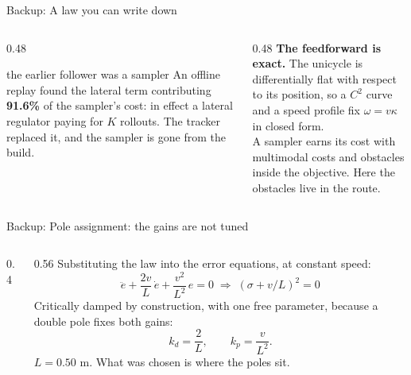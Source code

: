 \documentclass[10pt, aspectratio=169]{beamer}
\begin{document}
\begin{frame}{Backup: A law you can write down}
  \begin{columns}[c]
    \begin{column}{0.48\textwidth}
      \begin{measured}{the earlier follower was a sampler}
        \small
        An offline replay found the lateral term contributing \textbf{91.6\%} of the sampler's cost:
        in effect a lateral regulator paying for $K$ rollouts. The tracker replaced it, and the
        sampler is gone from the build.
      \end{measured}
    \end{column}
    \begin{column}{0.48\textwidth}
      \small
      \textbf{The feedforward is exact.} The unicycle is differentially flat with respect to its
      position, so a $C^2$ curve and a speed profile fix $\omega=v\kappa$ in closed form.\\[0.6em]
      A sampler earns its cost with multimodal costs and obstacles inside the objective. Here the
      obstacles live in the route.
    \end{column}
  \end{columns}
  \vspace{0.6em}
\end{frame}

\begin{frame}{Backup: Pole assignment: the gains are not tuned}
  \begin{columns}[c]
    \begin{column}{0.4\textwidth}
      \centering
    \end{column}
    \begin{column}{0.56\textwidth}
      Substituting the law into the error equations, at constant speed:
      \[
        \ddot e + \frac{2v}{L}\,\dot e + \frac{v^2}{L^2}\,e = 0
        \;\Longrightarrow\; (\sigma + v/L)^2 = 0
      \]
      \small
      Critically damped by construction, with one free parameter, because a double pole fixes both
      gains:
      \[ k_d = \frac{2}{L},\qquad k_p = \frac{v}{L^2}. \]
      $L = 0.50$ m. What was chosen is where the poles sit.
    \end{column}
  \end{columns}
\end{frame}
\end{document}
